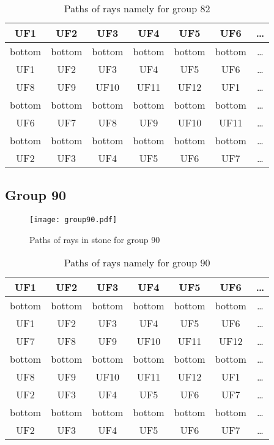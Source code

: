 \begin{table}[h!]
\centering
\begin{tabular}{|c|c|c|c|c|c|c|}
\hline
UF1 & UF2 & UF3 & UF4 & UF5 & UF6 & \dots \\
\hline
bottom & bottom & bottom & bottom & bottom & bottom & \dots \\
\hline
UF1 & UF2 & UF3 & UF4 & UF5 & UF6 & \dots \\
\hline
UF8 & UF9 & UF10 & UF11 & UF12 & UF1 & \dots \\
\hline
bottom & bottom & bottom & bottom & bottom & bottom & \dots \\
\hline
UF6 & UF7 & UF8 & UF9 & UF10 & UF11 & \dots \\
\hline
bottom & bottom & bottom & bottom & bottom & bottom & \dots \\
\hline
UF2 & UF3 & UF4 & UF5 & UF6 & UF7 & \dots \\
\hline
\end{tabular}
\caption{Paths of rays namely for group 82}
\label{table:TableGroup82}
\end{table}
\newpage
\subsection*{Group 90}






\begin{figure}[h!]
\centering
\texttt{[image: group90.pdf]}
\caption{Paths of rays in stone for group 90}
\label{table:FigGroup90}
\end{figure}



\begin{table}[h!]
\centering
\begin{tabular}{|c|c|c|c|c|c|c|}
\hline
UF1 & UF2 & UF3 & UF4 & UF5 & UF6 & \dots \\
\hline
bottom & bottom & bottom & bottom & bottom & bottom & \dots \\
\hline
UF1 & UF2 & UF3 & UF4 & UF5 & UF6 & \dots \\
\hline
UF7 & UF8 & UF9 & UF10 & UF11 & UF12 & \dots \\
\hline
bottom & bottom & bottom & bottom & bottom & bottom & \dots \\
\hline
UF8 & UF9 & UF10 & UF11 & UF12 & UF1 & \dots \\
\hline
UF2 & UF3 & UF4 & UF5 & UF6 & UF7 & \dots \\
\hline
bottom & bottom & bottom & bottom & bottom & bottom & \dots \\
\hline
UF2 & UF3 & UF4 & UF5 & UF6 & UF7 & \dots \\
\hline
\end{tabular}
\caption{Paths of rays namely for group 90}
\label{table:TableGroup90}
\end{table}
\newpage
